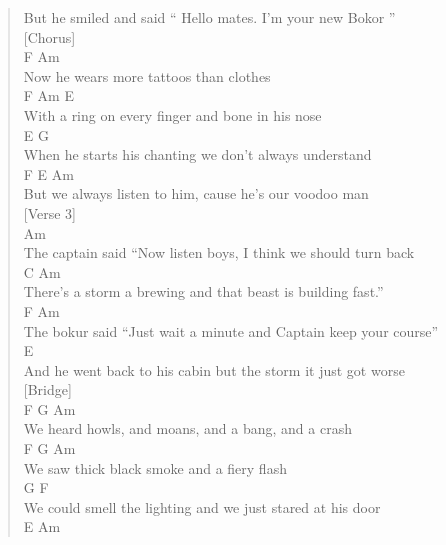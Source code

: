 \documentclass[11pt]{article}
\begin{document}
\begin{verse}
But he smiled and said `` Hello mates. I'm your new Bokor ''\\
\vspace*{1em}
[Chorus]\\
F                              Am\\
Now he wears more tattoos than clothes\\
\hspace*{7em}F                        Am          E\\
With a ring on every finger and bone in his nose\\
E                                    G\\
When he starts his chanting we don't always understand\\
\hspace*{7em}F             E             Am\\
But we always listen to him, cause he's our voodoo man\\
\vspace*{1em}
[Verse 3]\\
Am\\
The captain said ``Now listen boys, I think we should turn back\\
C                                  Am\\
There's a storm a brewing and that beast is building fast.''\\
\hspace*{4em}F                                  Am\\
The bokur said ``Just wait a minute and Captain keep your course''\\
\hspace*{7em}E\\
And he went back to his cabin but the storm it just got worse\\
\vspace*{1em}
[Bridge]\\
F                   G            Am\\
We heard howls, and moans, and a bang, and a crash\\
F                  G     Am\\
We saw thick black smoke and a fiery flash\\
G                                       F\\
We could smell the lighting and we just stared at his door\\
\hspace*{4em}E                                           Am\\

\end{verse}
\end{document}
